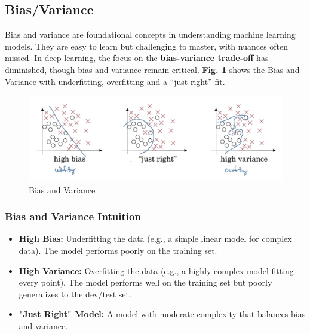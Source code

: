 \documentclass[letterpaper,12pt,notitlepage,twoside]{report}
\begin{document}
\subsection{Bias/Variance}
Bias and variance are foundational concepts in understanding machine learning models. They are easy to learn but challenging to master, with nuances often missed. In deep learning, the focus on the \textbf{bias-variance trade-off} has diminished, though bias and variance remain critical.
\textbf{Fig. \ref{fig:17}} shows the Bias and Variance with underfitting, overfitting and a ``just right'' fit.
\begin{figure}[h]
	\centering
	\includegraphics[width=\textwidth]{Images/Bias-Variance.png}
	\caption{Bias and Variance}
	\label{fig:17}
\end{figure}
\FloatBarrier

\subsubsection*{Bias and Variance Intuition}
\begin{itemize}[leftmargin=*]
    \item \textbf{High Bias:} Underfitting the data (e.g., a simple linear model for complex data). The model performs poorly on the training set.
    \item \textbf{High Variance:} Overfitting the data (e.g., a highly complex model fitting every point). The model performs well on the training set but poorly generalizes to the dev/test set.
    \item \textbf{"Just Right" Model:} A model with moderate complexity that balances bias and variance.
\end{itemize}
\end{document}
